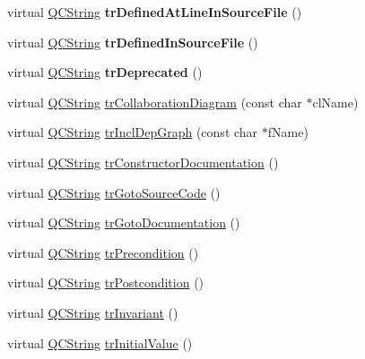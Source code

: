 \begin{DoxyCompactItemize}
virtual \mbox{\hyperlink{class_q_c_string}{Q\+C\+String}} {\bfseries tr\+Defined\+At\+Line\+In\+Source\+File} ()
\item 
\mbox{\label{class_translator_arabic_aa33a2d030623092fd2ac8b1a3ef3dd15}} 
virtual \mbox{\hyperlink{class_q_c_string}{Q\+C\+String}} {\bfseries tr\+Defined\+In\+Source\+File} ()
\item 
\mbox{\label{class_translator_arabic_af669b579785efebe5da822b73ef38d19}} 
virtual \mbox{\hyperlink{class_q_c_string}{Q\+C\+String}} {\bfseries tr\+Deprecated} ()
\item 
virtual \mbox{\hyperlink{class_q_c_string}{Q\+C\+String}} \mbox{\hyperlink{class_translator_arabic_a6ca15143ebd2361a7b1245e5c5efca8c}{tr\+Collaboration\+Diagram}} (const char $\ast$cl\+Name)
\item 
virtual \mbox{\hyperlink{class_q_c_string}{Q\+C\+String}} \mbox{\hyperlink{class_translator_arabic_aaa2e9d86d62c6d0c529a4e4674ee93b0}{tr\+Incl\+Dep\+Graph}} (const char $\ast$f\+Name)
\item 
virtual \mbox{\hyperlink{class_q_c_string}{Q\+C\+String}} \mbox{\hyperlink{class_translator_arabic_af0b71c62bd906419d092565d64546aff}{tr\+Constructor\+Documentation}} ()
\item 
virtual \mbox{\hyperlink{class_q_c_string}{Q\+C\+String}} \mbox{\hyperlink{class_translator_arabic_af6dd093850dd0c255d7421b6063d79ca}{tr\+Goto\+Source\+Code}} ()
\item 
virtual \mbox{\hyperlink{class_q_c_string}{Q\+C\+String}} \mbox{\hyperlink{class_translator_arabic_a80b353827c8c85f04426634456b44c65}{tr\+Goto\+Documentation}} ()
\item 
virtual \mbox{\hyperlink{class_q_c_string}{Q\+C\+String}} \mbox{\hyperlink{class_translator_arabic_a7ec599787534ebd84dda9bb8ed77d805}{tr\+Precondition}} ()
\item 
virtual \mbox{\hyperlink{class_q_c_string}{Q\+C\+String}} \mbox{\hyperlink{class_translator_arabic_a409bdca2f430c6ef7addadf3e11ad8b4}{tr\+Postcondition}} ()
\item 
virtual \mbox{\hyperlink{class_q_c_string}{Q\+C\+String}} \mbox{\hyperlink{class_translator_arabic_ade17d8c502815f2621b59e7ceee94ad7}{tr\+Invariant}} ()
\item 
virtual \mbox{\hyperlink{class_q_c_string}{Q\+C\+String}} \mbox{\hyperlink{class_translator_arabic_a53954a512040eb590ba15eead23028c3}{tr\+Initial\+Value}} ()

\end{DoxyCompactItemize}
